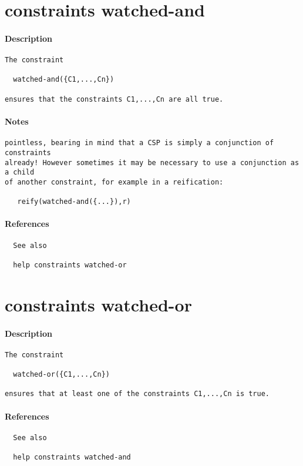 \section{constraints watched-and}
\paragraph{Description}
{\footnotesize
\begin{verbatim}
The constraint

  watched-and({C1,...,Cn})

ensures that the constraints C1,...,Cn are all true.
\end{verbatim}
}
\paragraph{Notes}
{\footnotesize
\begin{verbatim}
pointless, bearing in mind that a CSP is simply a conjunction of constraints
already! However sometimes it may be necessary to use a conjunction as a child
of another constraint, for example in a reification:

   reify(watched-and({...}),r)
\end{verbatim}
}
\paragraph{References}
{\footnotesize
\begin{verbatim}
  See also

  help constraints watched-or
\end{verbatim}
}
\section{constraints watched-or}
\paragraph{Description}
{\footnotesize
\begin{verbatim}
The constraint

  watched-or({C1,...,Cn})

ensures that at least one of the constraints C1,...,Cn is true.
\end{verbatim}
}
\paragraph{References}
{\footnotesize
\begin{verbatim}
  See also

  help constraints watched-and
\end{verbatim}
}
